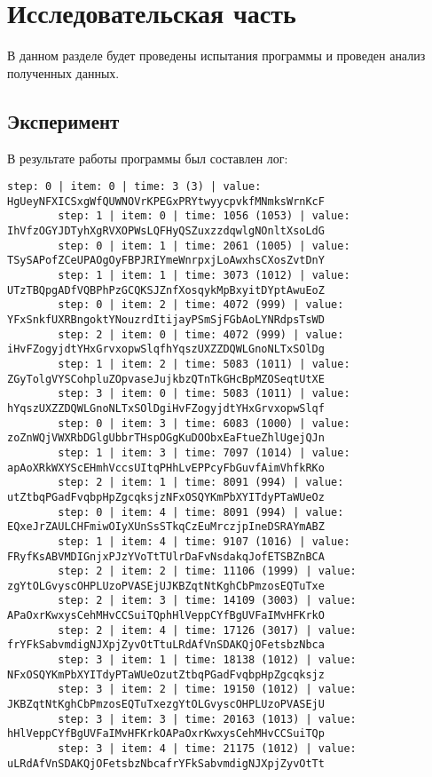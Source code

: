 \chapter{Исследовательская часть}
В данном разделе будет проведены испытания программы и проведен анализ полученных данных.
\section{Эксперимент}
В результате работы программы был составлен лог:
\begin{center}
	\captionsetup{justification=raggedright,singlelinecheck=off}
	\begin{lstlisting}[label=brute,caption = Экспериментальные данные] 
		step: 0 | item: 0 | time: 3 (3) | value: HgUeyNFXICSxgWfQUWNOVrKPEGxPRYtwyycpvkfMNmksWrnKcF
		step: 1 | item: 0 | time: 1056 (1053) | value: IhVfzOGYJDTyhXgRVXOPWsLQFHyQSZuxzzdqwlgNOnltXsoLdG
		step: 0 | item: 1 | time: 2061 (1005) | value: TSySAPofZCeUPAOgOyFBPJRIYmeWnrpxjLoAwxhsCXosZvtDnY
		step: 1 | item: 1 | time: 3073 (1012) | value: UTzTBQpgADfVQBPhPzGCQKSJZnfXosqykMpBxyitDYptAwuEoZ
		step: 0 | item: 2 | time: 4072 (999) | value: YFxSnkfUXRBngoktYNouzrdItijayPSmSjFGbAoLYNRdpsTsWD
		step: 2 | item: 0 | time: 4072 (999) | value: iHvFZogyjdtYHxGrvxopwSlqfhYqszUXZZDQWLGnoNLTxSOlDg
		step: 1 | item: 2 | time: 5083 (1011) | value: ZGyTolgVYSCohpluZOpvaseJujkbzQTnTkGHcBpMZOSeqtUtXE
		step: 3 | item: 0 | time: 5083 (1011) | value: hYqszUXZZDQWLGnoNLTxSOlDgiHvFZogyjdtYHxGrvxopwSlqf
		step: 0 | item: 3 | time: 6083 (1000) | value: zoZnWQjVWXRbDGlgUbbrTHspOGgKuDOObxEaFtueZhlUgejQJn
		step: 1 | item: 3 | time: 7097 (1014) | value: apAoXRkWXYScEHmhVccsUItqPHhLvEPPcyFbGuvfAimVhfkRKo
		step: 2 | item: 1 | time: 8091 (994) | value: utZtbqPGadFvqbpHpZgcqksjzNFxOSQYKmPbXYITdyPTaWUeOz
		step: 0 | item: 4 | time: 8091 (994) | value: EQxeJrZAULCHFmiwOIyXUnSsSTkqCzEuMrczjpIneDSRAYmABZ
		step: 1 | item: 4 | time: 9107 (1016) | value: FRyfKsABVMDIGnjxPJzYVoTtTUlrDaFvNsdakqJofETSBZnBCA
		step: 2 | item: 2 | time: 11106 (1999) | value: zgYtOLGvyscOHPLUzoPVASEjUJKBZqtNtKghCbPmzosEQTuTxe
		step: 2 | item: 3 | time: 14109 (3003) | value: APaOxrKwxysCehMHvCCSuiTQphHlVeppCYfBgUVFaIMvHFKrkO
		step: 2 | item: 4 | time: 17126 (3017) | value: frYFkSabvmdigNJXpjZyvOtTtuLRdAfVnSDAKQjOFetsbzNbca
		step: 3 | item: 1 | time: 18138 (1012) | value: NFxOSQYKmPbXYITdyPTaWUeOzutZtbqPGadFvqbpHpZgcqksjz
		step: 3 | item: 2 | time: 19150 (1012) | value: JKBZqtNtKghCbPmzosEQTuTxezgYtOLGvyscOHPLUzoPVASEjU
		step: 3 | item: 3 | time: 20163 (1013) | value: hHlVeppCYfBgUVFaIMvHFKrkOAPaOxrKwxysCehMHvCCSuiTQp
		step: 3 | item: 4 | time: 21175 (1012) | value: uLRdAfVnSDAKQjOFetsbzNbcafrYFkSabvmdigNJXpjZyvOtTt
	\end{lstlisting}
\end{center}
